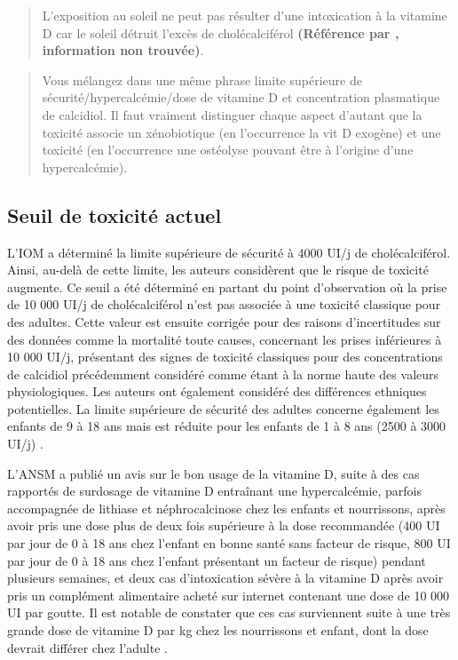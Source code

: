 \documentclass[
  a4paper,
  DIV=11,
  numbers=noendperiod,
  listof=totoc]{scrreprt}
\begin{document}
\begin{quote}
L'exposition au soleil ne peut pas résulter d'une intoxication à la
vitamine D car le soleil détruit l'excès de cholécalciférol
\textbf{(Référence \textcite{Mawer.1985} par \textcite{Alshahrani.2013},
information non trouvée)}.
\end{quote}

\begin{quote}
Vous mélangez dans une même phrase limite supérieure de
sécurité/hypercalcémie/dose de vitamine D et concentration plasmatique
de calcidiol. Il faut vraiment distinguer chaque aspect d'autant que la
toxicité associe un xénobiotique (en l'occurrence la vit D exogène) et
une toxicité (en l'occurrence une ostéolyse pouvant être à l'origine
d'une hypercalcémie).
\end{quote}

\hypertarget{seuil-de-toxicituxe9-actuel}{%
\subsection{Seuil de toxicité
actuel}\label{seuil-de-toxicituxe9-actuel}}

L'\ac{IOM} a déterminé la limite supérieure de sécurité à 4000 UI/j de
cholécalciférol. Ainsi, au-delà de cette limite, les auteurs considèrent
que le risque de toxicité augmente. Ce seuil a été déterminé en partant
du point d'observation où la prise de 10 000 UI/j de cholécalciférol
n'est pas associée à une toxicité classique pour des adultes. Cette
valeur est ensuite corrigée pour des raisons d'incertitudes sur des
données comme la mortalité toute causes, concernant les prises
inférieures à 10 000 UI/j, présentant des signes de toxicité classiques
pour des concentrations de calcidiol précédemment considéré comme étant
à la norme haute des valeurs physiologiques. Les auteurs ont également
considéré des différences ethniques potentielles. La limite supérieure
de sécurité des adultes concerne également les enfants de 9 à 18 ans
mais est réduite pour les enfants de 1 à 8 ans (2500 à 3000 UI/j)
\autocite{IOM.2011}.

L'ANSM a publié un avis sur le bon usage de la vitamine D, suite à des
cas rapportés de surdosage de vitamine D entraînant une hypercalcémie,
parfois accompagnée de lithiase et néphrocalcinose chez les enfants et
nourrissons, après avoir pris une dose plus de deux fois supérieure à la
dose recommandée (400 UI par jour de 0 à 18 ans chez l'enfant en bonne
santé sans facteur de risque, 800 UI par jour de 0 à 18 ans chez
l'enfant présentant un facteur de risque) pendant plusieurs semaines, et
deux cas d'intoxication sévère à la vitamine D après avoir pris un
complément alimentaire acheté sur internet contenant une dose de 10 000
UI par goutte. Il est notable de constater que ces cas surviennent suite
à une très grande dose de vitamine D par kg chez les nourrissons et
enfant, dont la dose devrait différer chez l'adulte
\autocite{ANSM.2021}.
\end{document}
